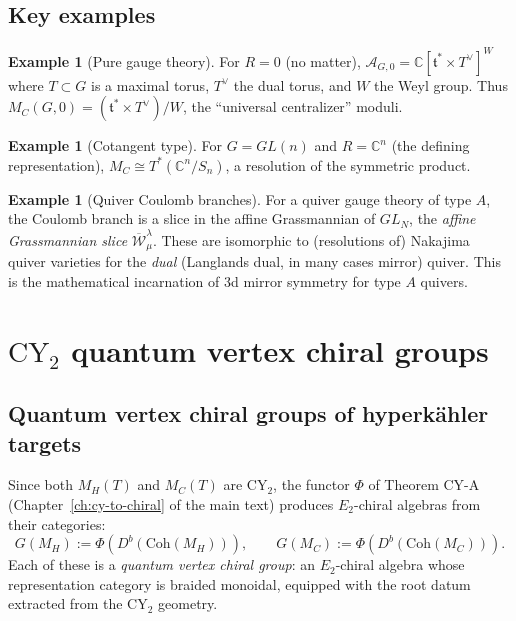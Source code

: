 \documentclass[11pt]{article}
\theoremstyle{definition}
\newtheorem{example}[theorem]{Example}
\theoremstyle{remark}
\newcommand{\CY}{\mathrm{CY}}
\newcommand{\Coh}{\mathrm{Coh}}
\newcommand{\Etwo}{E_2}
\begin{document}
\subsection{Key examples}

\begin{example}[Pure gauge theory]
\label{ex:pure-gauge}
For $R = 0$ (no matter), $\mathcal{A}_{G,0} = \mathbb{C}[\mathfrak{t}^* \times T^\vee]^W$ where $T \subset G$ is a maximal torus, $T^\vee$ the dual torus, and $W$ the Weyl group. Thus $M_C(G, 0) = (\mathfrak{t}^* \times T^\vee)/W$, the ``universal centralizer'' moduli.
\end{example}

\begin{example}[Cotangent type]
\label{ex:cotangent}
For $G = GL(n)$ and $R = \mathbb{C}^n$ (the defining representation), $M_C \cong T^*(\mathbb{C}^n / S_n)$, a resolution of the symmetric product.
\end{example}

\begin{example}[Quiver Coulomb branches]
\label{ex:quiver-coulomb}
For a quiver gauge theory of type $A$, the Coulomb branch is a slice in the affine Grassmannian of $GL_N$, the \emph{affine Grassmannian slice} $\overline{\mathcal{W}}^\lambda_\mu$. These are isomorphic to (resolutions of) Nakajima quiver varieties for the \emph{dual} (Langlands dual, in many cases mirror) quiver. This is the mathematical incarnation of 3d mirror symmetry for type $A$ quivers.
\end{example}

\section{$\CY_2$ quantum vertex chiral groups}
\label{sec:cy2-qvcg}

\subsection{Quantum vertex chiral groups of hyperk\"ahler targets}

Since both $M_H(T)$ and $M_C(T)$ are $\CY_2$, the functor $\Phi$ of Theorem CY-A (Chapter~\ref*{ch:cy-to-chiral} of the main text) produces $\Etwo$-chiral algebras from their categories:
\[
 G(M_H) := \Phi(D^b(\Coh(M_H))), \qquad G(M_C) := \Phi(D^b(\Coh(M_C))).
\]
Each of these is a \emph{quantum vertex chiral group}: an $\Etwo$-chiral algebra whose representation category is braided monoidal, equipped with the root datum extracted from the $\CY_2$ geometry.
\end{document}
